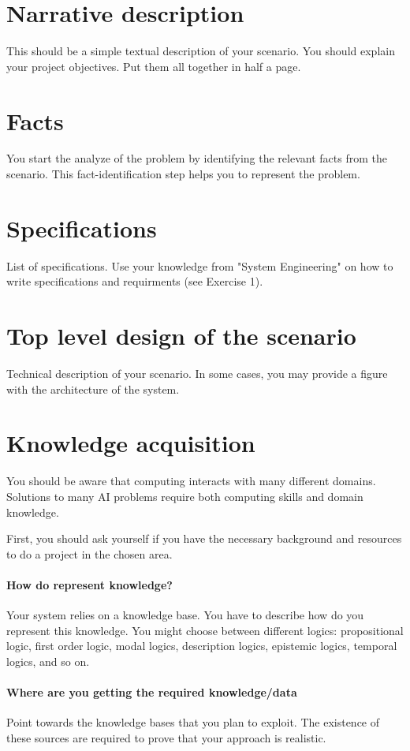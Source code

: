 \documentclass[a4paper,12pt]{report}
\begin{document}
\section{Narrative description}
This should be a simple textual description of your scenario.
You should explain your project objectives.
Put them all together in half a page.

\section{Facts}
You start the analyze of the problem by identifying 
the relevant facts from the scenario.
This fact-identification step helps you to represent the problem.


\section{Specifications}
List of specifications. 
Use your knowledge from "System Engineering" on how to write specifications and requirments (see Exercise 1).

\section{Top level design of the scenario}
Technical description of your scenario. 
In some cases, you may provide a figure with the architecture of the system. 


\section{Knowledge acquisition}
You should be aware that computing interacts with many different domains. 
Solutions to many AI problems require both computing skills and domain knowledge.

First, you should ask yourself if you have the necessary background and resources to do
a project in the chosen area. 

\paragraph{How do represent knowledge?} 
Your system relies on a knowledge base.
You have to describe how do you represent this knowledge.
You might choose between different logics: 
propositional logic, first order logic, modal logics, description logics, epistemic logics, 
temporal logics, and so on. 

\paragraph{Where are you getting the required knowledge/data}
Point towards the knowledge bases that you plan to exploit. 
The existence of these sources are required to prove that your approach is realistic.
\end{document}
